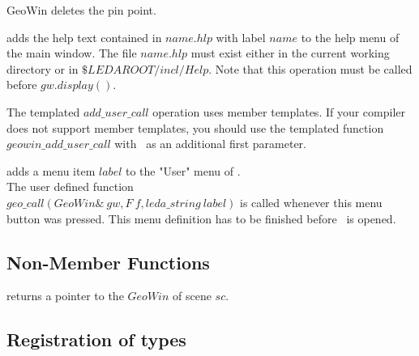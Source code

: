 \begin{ccRefClass}{GeoWin}
{deletes the pin point.}

{adds the help text contained in $name.hlp$ with label $name$
to the help menu of the main window. The file $name.hlp$ must
exist either in the current working directory or in
$\$LEDAROOT/incl/Help$. Note that this operation must be called
before $gw.display()$. }

\medskip
The templated $add\_user\_call$ operation uses member templates. If your 
compiler does not support member templates, you should use
the templated function $geowin\_add\_user\_call$ with
\ccVar\ as an additional first parameter.

{adds a menu item $label$ to the "User" menu of \ccVar . \\
The user defined function \\
$geo\_call(GeoWin\& \ gw, F \ f, leda\_string \ label)$
is called whenever this menu button was pressed. This menu 
definition has to be finished before \ccVar\ is opened. }

\end{ccRefClass}

\subsection{Non-Member Functions}

{
  returns a pointer to the $GeoWin$ of scene $sc$.
}

\subsection{Registration of types}

